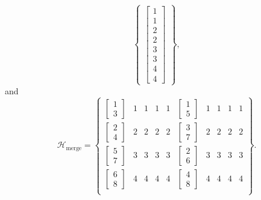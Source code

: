 {{\begin{equation}
\begin{Bmatrix}
		\begin{bmatrix} 1 \\ 1 \\ 2 \\ 2 \\ 3 \\ 3 \\ 4 \\ 4 \end{bmatrix}
	\end{Bmatrix},
\end{equation}
and
\begin{equation} \label{eq:Hmerge_SFex2}
	\mathcal{H}_{\text{merge}} = \begin{Bmatrix}
		\begin{bmatrix}	1 \\ 3 \end{bmatrix} & 1 & 1 & 1 & 1 & \begin{bmatrix}	1 \\ 5 \end{bmatrix} & 1 & 1 & 1 & 1 \\
		\begin{bmatrix}	2 \\ 4 \end{bmatrix} & 2 & 2 & 2 & 2 & \begin{bmatrix}	3 \\ 7 \end{bmatrix} & 2 & 2 & 2 & 2 \\
		\begin{bmatrix}	5 \\ 7 \end{bmatrix} & 3 & 3 & 3 & 3 & \begin{bmatrix}	2 \\ 6 \end{bmatrix} & 3 & 3 & 3 & 3 \\
		\begin{bmatrix}	6 \\ 8 \end{bmatrix} & 4 & 4 & 4 & 4 & \begin{bmatrix}	4 \\ 8 \end{bmatrix} & 4 & 4 & 4 & 4 \\
	\end{Bmatrix}.
\end{equation}

}}
